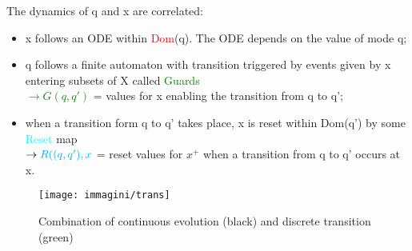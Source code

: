 The dynamics of q and x are correlated:
\begin{itemize}
	\item x follows an ODE within \textcolor{red}{Dom}(q). The ODE depends on the value of mode q;
	\item q follows a finite automaton with transition triggered by events given by x entering subsets of X called \textcolor{green}{Guards}\\
	\textcolor{green}{$\to G(q,q')$} = values for x enabling the transition from q to q';
	\item when a transition form q to q' takes place, x is reset within Dom(q') by some \textcolor{cyan}{Reset} map\\
	$\to\textcolor{cyan}{R((q,q'),x}$ = reset values for $x^+$ when a transition from q to q' occurs at x.
\end{itemize}
\begin{figure}[th]
	\centering
	\texttt{[image: immagini/trans]}
	\caption{Combination of continuous evolution (black) and discrete transition (green)}
	\label{fig:trans}
\end{figure}
